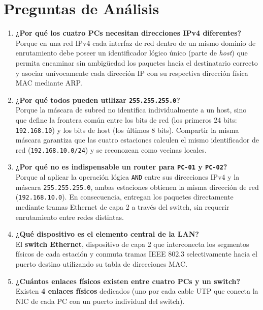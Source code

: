 \documentclass[11pt, a4paper]{article}
\begin{document}
\section{Preguntas de Análisis}

\begin{enumerate}
    \item \textbf{¿Por qué los cuatro PCs necesitan direcciones IPv4 diferentes?} \\
    Porque en una red IPv4 cada interfaz de red dentro de un mismo dominio de enrutamiento debe poseer un identificador lógico único (parte de \textit{host}) que permita encaminar sin ambigüedad los paquetes hacia el destinatario correcto y asociar unívocamente cada dirección IP con su respectiva dirección física MAC mediante ARP.
    \item \textbf{¿Por qué todos pueden utilizar \texttt{255.255.255.0}?} \\
    Porque la máscara de subred no identifica individualmente a un host, sino que define la frontera común entre los bits de red (los primeros 24 bits: \texttt{192.168.10}) y los bits de host (los últimos 8 bits). Compartir la misma máscara garantiza que las cuatro estaciones calculen el mismo identificador de red (\texttt{192.168.10.0/24}) y se reconozcan como vecinas locales.
    \item \textbf{¿Por qué no es indispensable un router para \texttt{PC-01} y \texttt{PC-02}?} \\
    Porque al aplicar la operación lógica \texttt{AND} entre sus direcciones IPv4 y la máscara \texttt{255.255.255.0}, ambas estaciones obtienen la misma dirección de red (\texttt{192.168.10.0}). En consecuencia, entregan los paquetes directamente mediante tramas Ethernet de capa 2 a través del switch, sin requerir enrutamiento entre redes distintas.
    \item \textbf{¿Qué dispositivo es el elemento central de la LAN?} \\
    El \textbf{switch Ethernet}, dispositivo de capa 2 que interconecta los segmentos físicos de cada estación y conmuta tramas IEEE 802.3 selectivamente hacia el puerto destino utilizando su tabla de direcciones MAC.
    \item \textbf{¿Cuántos enlaces físicos existen entre cuatro PCs y un switch?} \\
    Existen \textbf{4 enlaces físicos} dedicados (uno por cada cable UTP que conecta la NIC de cada PC con un puerto individual del switch).

\end{enumerate}
\end{document}
